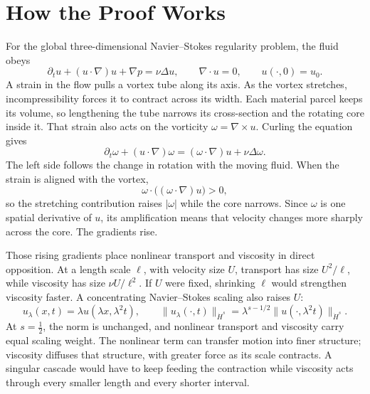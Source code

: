\documentclass[11pt]{article}
\begin{document}
\section*{How the Proof Works}

For the global three-dimensional Navier--Stokes regularity problem, the fluid obeys
\[
\partial_t u+(u\cdot\nabla)u+\nabla p=\nu\Delta u,
\qquad
\nabla\cdot u=0,
\qquad
u(\cdot,0)=u_0.
\]
A strain in the flow pulls a vortex tube along its axis. As the vortex stretches, incompressibility forces it to contract across its width. Each material parcel keeps its volume, so lengthening the tube narrows its cross-section and the rotating core inside it. That strain also acts on the vorticity \(\omega=\nabla\times u\). Curling the equation gives
\[
\partial_t\omega+(u\cdot\nabla)\omega
=(\omega\cdot\nabla)u+\nu\Delta\omega.
\]
The left side follows the change in rotation with the moving fluid. When the strain is aligned with the vortex,
\[
\omega\cdot\bigl((\omega\cdot\nabla)u\bigr)>0,
\]
so the stretching contribution raises \(|\omega|\) while the core narrows. Since \(\omega\) is one spatial derivative of \(u\), its amplification means that velocity changes more sharply across the core. The gradients rise.

Those rising gradients place nonlinear transport and viscosity in direct opposition. At a length scale \(\ell\), with velocity size \(U\), transport has size \(U^2/\ell\), while viscosity has size \(\nu U/\ell^2\). If \(U\) were fixed, shrinking \(\ell\) would strengthen viscosity faster. A concentrating Navier--Stokes scaling also raises \(U\):
\[
u_\lambda(x,t)=\lambda u(\lambda x,\lambda^2t),
\qquad
\|u_\lambda(\cdot,t)\|_{\dot H^s}
=\lambda^{s-1/2}\|u(\cdot,\lambda^2t)\|_{\dot H^s}.
\]
At \(s=\tfrac12\), the norm is unchanged, and nonlinear transport and viscosity carry equal scaling weight. The nonlinear term can transfer motion into finer structure; viscosity diffuses that structure, with greater force as its scale contracts. A singular cascade would have to keep feeding the contraction while viscosity acts through every smaller length and every shorter interval.
\end{document}
